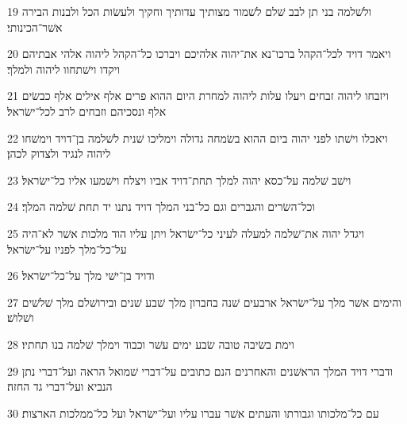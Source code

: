 \par 19 ולשׁלמה בני תן לבב שׁלם לשׁמור מצותיך עדותיך וחקיך ולעשׂות הכל ולבנות הבירה אשׁר־הכינותי׃
\par 20 ויאמר דויד לכל־הקהל ברכו־נא את־יהוה אלהיכם ויברכו כל־הקהל ליהוה אלהי אבתיהם ויקדו וישׁתחוו ליהוה ולמלך׃
\par 21 ויזבחו ליהוה זבחים ויעלו עלות ליהוה למחרת היום ההוא פרים אלף אילים אלף כבשׂים אלף ונסכיהם וזבחים לרב לכל־ישׂראל׃
\par 22 ויאכלו וישׁתו לפני יהוה ביום ההוא בשׂמחה גדולה וימליכו שׁנית לשׁלמה בן־דויד וימשׁחו ליהוה לנגיד ולצדוק לכהן׃
\par 23 וישׁב שׁלמה על־כסא יהוה למלך תחת־דויד אביו ויצלח וישׁמעו אליו כל־ישׂראל׃
\par 24 וכל־השׂרים והגברים וגם כל־בני המלך דויד נתנו יד תחת שׁלמה המלך׃
\par 25 ויגדל יהוה את־שׁלמה למעלה לעיני כל־ישׂראל ויתן עליו הוד מלכות אשׁר לא־היה על־כל־מלך לפניו על־ישׂראל׃
\par 26 ודויד בן־ישׁי מלך על־כל־ישׂראל׃
\par 27 והימים אשׁר מלך על־ישׂראל ארבעים שׁנה בחברון מלך שׁבע שׁנים ובירושׁלם מלך שׁלשׁים ושׁלושׁ׃
\par 28 וימת בשׂיבה טובה שׂבע ימים עשׁר וכבוד וימלך שׁלמה בנו תחתיו׃
\par 29 ודברי דויד המלך הראשׁנים והאחרנים הנם כתובים על־דברי שׁמואל הראה ועל־דברי נתן הנביא ועל־דברי גד החזה׃
\par 30 עם כל־מלכותו וגבורתו והעתים אשׁר עברו עליו ועל־ישׂראל ועל כל־ממלכות הארצות׃


